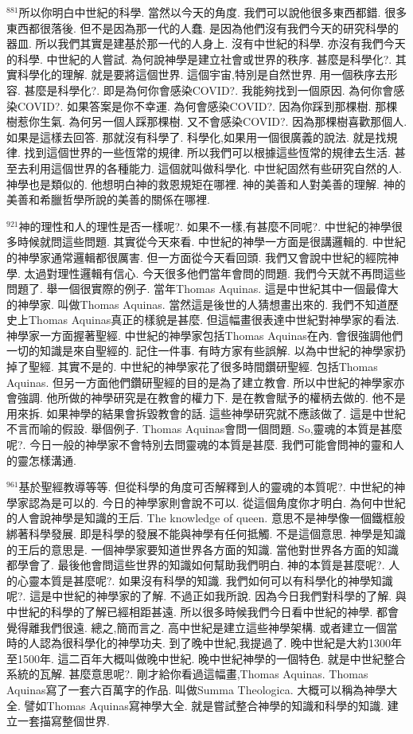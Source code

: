 \documentclass{book}
\begin{document}
$^{881}$所以你明白中世紀的科學.
當然以今天的角度.
我們可以說他很多東西都錯.
很多東西都很落後.
但不是因為那一代的人蠢.
是因為他們沒有我們今天的研究科學的器皿.
所以我們其實是建基於那一代的人身上.
沒有中世紀的科學.
亦沒有我們今天的科學.
中世紀的人嘗試.
為何說神學是建立社會或世界的秩序.
甚麼是科學化?.
其實科學化的理解.
就是要將這個世界.
這個宇宙,特別是自然世界.
用一個秩序去形容.
甚麼是科學化?.
即是為何你會感染COVID?.
我能夠找到一個原因.
為何你會感染COVID?.
如果答案是你不幸運.
為何會感染COVID?.
因為你踩到那棵樹.
那棵樹惹你生氣.
為何另一個人踩那棵樹.
又不會感染COVID?.
因為那棵樹喜歡那個人.
如果是這樣去回答.
那就沒有科學了.
科學化,如果用一個很廣義的說法.
就是找規律.
找到這個世界的一些恆常的規律.
所以我們可以根據這些恆常的規律去生活.
甚至去利用這個世界的各種能力.
這個就叫做科學化.
中世紀固然有些研究自然的人.
神學也是類似的.
他想明白神的救恩規矩在哪裡.
神的美善和人對美善的理解.
神的美善和希臘哲學所說的美善的關係在哪裡.

$^{921}$神的理性和人的理性是否一樣呢?.
如果不一樣,有甚麼不同呢?.
中世紀的神學很多時候就問這些問題.
其實從今天來看.
中世紀的神學一方面是很講邏輯的.
中世紀的神學家通常邏輯都很厲害.
但一方面從今天看回頭.
我們又會說中世紀的經院神學.
太過對理性邏輯有信心.
今天很多他們當年會問的問題.
我們今天就不再問這些問題了.
舉一個很實際的例子.
當年Thomas Aquinas.
這是中世紀其中一個最偉大的神學家.
叫做Thomas Aquinas.
當然這是後世的人猜想畫出來的.
我們不知道歷史上Thomas Aquinas真正的樣貌是甚麼.
但這幅畫很表達中世紀對神學家的看法.
神學家一方面握著聖經.
中世紀的神學家包括Thomas Aquinas在內.
會很強調他們一切的知識是來自聖經的.
記住一件事.
有時方家有些誤解.
以為中世紀的神學家扔掉了聖經.
其實不是的.
中世紀的神學家花了很多時間鑽研聖經.
包括Thomas Aquinas.
但另一方面他們鑽研聖經的目的是為了建立教會.
所以中世紀的神學家亦會強調.
他所做的神學研究是在教會的權力下.
是在教會賦予的權柄去做的.
他不是用來拆.
如果神學的結果會拆毀教會的話.
這些神學研究就不應該做了.
這是中世紀不言而喻的假設.
舉個例子.
Thomas Aquinas會問一個問題.
So,靈魂的本質是甚麼呢?.
今日一般的神學家不會特別去問靈魂的本質是甚麼.
我們可能會問神的靈和人的靈怎樣溝通.

$^{961}$基於聖經教導等等.
但從科學的角度可否解釋到人的靈魂的本質呢?.
中世紀的神學家認為是可以的.
今日的神學家則會說不可以.
從這個角度你才明白.
為何中世紀的人會說神學是知識的王后.
The knowledge of queen.
意思不是神學像一個鐵框般綁著科學發展.
即是科學的發展不能與神學有任何抵觸.
不是這個意思.
神學是知識的王后的意思是.
一個神學家要知道世界各方面的知識.
當他對世界各方面的知識都學會了.
最後他會問這些世界的知識如何幫助我們明白.
神的本質是甚麼呢?.
人的心靈本質是甚麼呢?.
如果沒有科學的知識.
我們如何可以有科學化的神學知識呢?.
這是中世紀的神學家的了解.
不過正如我所說.
因為今日我們對科學的了解.
與中世紀的科學的了解已經相距甚遠.
所以很多時候我們今日看中世紀的神學.
都會覺得離我們很遠.
總之,簡而言之.
高中世紀是建立這些神學架構.
或者建立一個當時的人認為很科學化的神學功夫.
到了晚中世紀,我提過了.
晚中世紀是大約1300年至1500年.
這二百年大概叫做晚中世紀.
晚中世紀神學的一個特色.
就是中世紀整合系統的瓦解.
甚麼意思呢?.
剛才給你看過這幅畫,Thomas Aquinas.
Thomas Aquinas寫了一套六百萬字的作品.
叫做Summa Theologica.
大概可以稱為神學大全.
譬如Thomas Aquinas寫神學大全.
就是嘗試整合神學的知識和科學的知識.
建立一套描寫整個世界.
\end{document}
